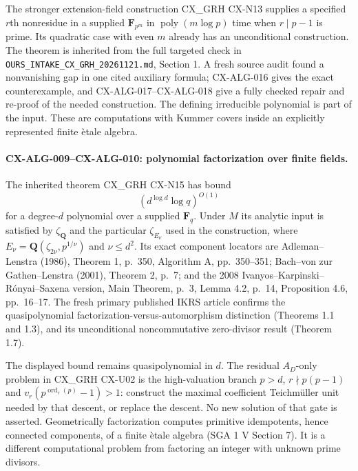 The stronger extension-field construction CX\_GRH CX-N13 supplies a specified
$r$th nonresidue in a supplied $\mathbf F_{p^m}$ in
$\operatorname{poly}(m\log p)$ time when $r\mid p-1$ is prime. Its quadratic
case with even $m$ already has an unconditional construction. The theorem is
inherited from the full targeted check in
\texttt{OURS\_INTAKE\_CX\_GRH\_20261121.md}, Section 1. A fresh source audit
found a nonvanishing gap in one cited auxiliary formula; CX-ALG-016 gives
the exact counterexample, and CX-ALG-017--CX-ALG-018 give a fully checked
repair and re-proof of the needed construction. The defining
irreducible polynomial is part of the input. These are computations with
Kummer covers inside an explicitly represented finite \`etale algebra.

\paragraph{CX-ALG-009--CX-ALG-010: polynomial factorization over finite fields.}
The inherited theorem CX\_GRH CX-N15 has bound
\[
                 (d^{\log d}\log q)^{O(1)}
\]
for a degree-$d$ polynomial over a supplied $\mathbf F_q$. Under $M$ its
analytic input is satisfied by $\zeta_{\mathbf Q}$ and the particular
$\zeta_{E_\nu}$ used in the construction, where
$E_\nu=\mathbf Q(\zeta_{2\nu},p^{1/\nu})$ and $\nu\leq d^2$.
Its exact component locators are Adleman--Lenstra (1986), Theorem 1, p.~350,
Algorithm A, pp.~350--351; Bach--von zur Gathen--Lenstra (2001), Theorem 2,
p.~7; and the 2008 Ivanyos--Karpinski--R\'onyai--Saxena version, Main Theorem,
p.~3, Lemma 4.2, p.~14, Proposition 4.6, pp.~16--17.
The fresh primary published IKRS article confirms the quasipolynomial
factorization-versus-automorphism distinction (Theorems 1.1 and 1.3), and
its unconditional noncommutative zero-divisor result (Theorem 1.7).

The displayed bound remains quasipolynomial in $d$. The residual $A_D$-only
problem in CX\_GRH CX-U02 is the high-valuation branch
$p>d$, $r\nmid p(p-1)$ and
$v_r(p^{\operatorname{ord}_r(p)}-1)>1$: construct the maximal coefficient
Teichm\"uller unit needed by that descent, or replace the descent. No new
solution of that gate is asserted. Geometrically factorization computes
primitive idempotents, hence connected components, of a finite \`etale
algebra (SGA 1 V Section 7). It is a different computational problem from
factoring an integer with unknown prime divisors.

